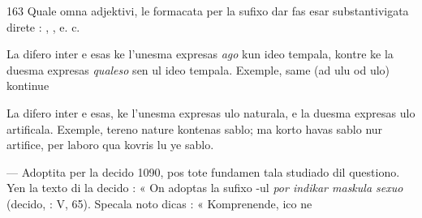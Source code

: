 \begin{VUpage}[167]{163}
Quale omna adjektivi, le formacata per la sufixo  dar\cc
fas esar substantivigata direte : , , e. c.

La difero inter  e  esas ke l'unesma expresas \textit{ago}\nl
kun ideo tempala, kontre ke la duesma expresas \textit{qualeso} sen\nl
ul ideo tempala. Exemple, \nl
{} same  (ad ulu od ulo) \nl
kontinue 

La difero inter  e  esas, ke l'unesma expresas ulo\nl
naturala, e la duesma expresas ulo artificala. Exemple,\nl
tereno  nature kontenas sablo; ma korto \nl
havas sablo nur artifice, per laboro qua kovris lu ye sablo.\parplein

 --- Adoptita per la decido 1090, pos tote fundamen\cc
tala studiado dil questiono. Yen la texto di la decido : « On\nl
adoptas la sufixo -ul \textit{por indikar maskula sexuo} (decido, : V, 65). Specala noto dicas : « Komprenende, ico ne
\end{VUpage}

